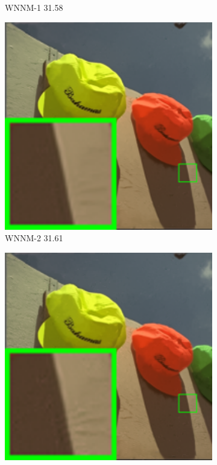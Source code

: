 \begin{figure}
\begin{subfigure}[t]{0.19\textwidth}
		\caption{WNNM-1 31.58}
    \end{subfigure}
    \hfill
    \begin{subfigure}[t]{0.19\textwidth}
        \centering
        \includegraphics[width=1\textwidth]{images/mcwnnm/24images/resize_br_WNNMJ_nSig402030_kodim03.png}
		\caption{WNNM-2 31.61}
    \end{subfigure}
    \hfill
    \begin{subfigure}[t]{0.19\textwidth}
        \centering
        \includegraphics[width=1\textwidth]{images/mcwnnm/24images/resize_br_WNNM_ADMM_nSig402030_kodim03.png}

\end{subfigure}
\end{figure}
